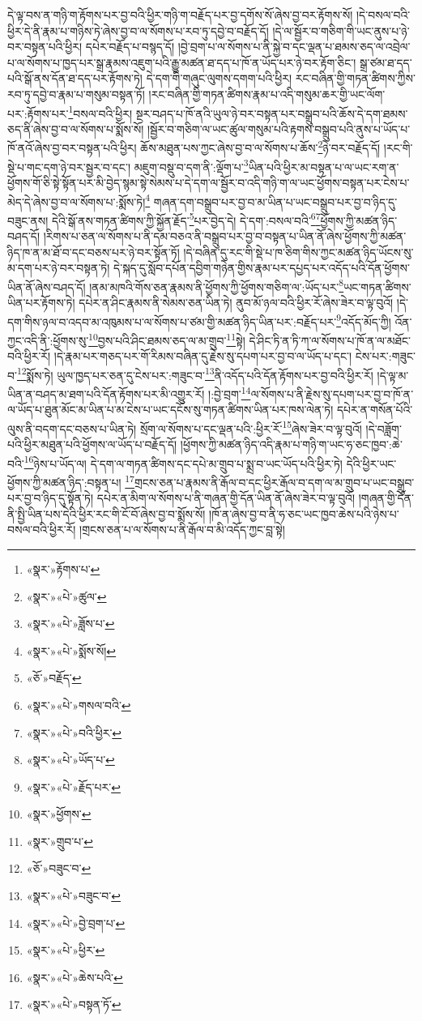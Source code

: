 དེ་ལྟ་བས་ན་གཉི་ག་རྟོགས་པར་བྱ་བའི་ཕྱིར་གཉི་ག་བརྗོད་པར་བྱ་དགོས་སོ་ཞེས་བྱ་བར་རྟོགས་སོ། །དེ་བསལ་བའི་ཕྱིར་དེ་ནི་རྣམ་པ་གཉིས་ཏེ་ཞེས་བྱ་བ་ལ་སོགས་པ་རབ་ཏུ་དབྱེ་བ་བརྗོད་དོ། །དེ་ལ་སྦྱོར་བ་གཅིག་གི་ཡང་ནུས་པ་ཉེ་བར་བསྟན་པའི་ཕྱིར། དཔེར་བརྗོད་པ་བསྙད་དོ། །བྱེ་བྲག་པ་ལ་སོགས་པ་ནི་སྐྱེ་བ་དང་ལྡན་པ་ཐམས་ཅད་ལ་འབྲེལ་པ་ལ་སོགས་པ་ཁྱད་པར་སྒྲ་རྣམས་འཇུག་པའི་རྒྱུ་མཚན་ཐ་དད་པ་ཁོ་ན་ཡོད་པར་ཉེ་བར་རྟོག་ཅིང་། སྒྲ་ཙམ་ཐ་དད་པའི་སྒོ་ནས་དོན་ཐ་དད་པར་རྟོགས་ཏེ། དེ་དག་གི་གཞུང་ལུགས་དགག་པའི་ཕྱིར། རང་བཞིན་གྱི་གཏན་ཚིགས་ཀྱིས་རབ་ཏུ་དབྱེ་བ་རྣམ་པ་གསུམ་བསྟན་ཏོ། །རང་བཞིན་གྱི་གཏན་ཚིགས་རྣམ་པ་འདི་གསུམ་ཆར་གྱི་ཡང་ལོག་པར་:རྟོགས་པར་\footnote{«སྣར་»རྟོགས་པ་}བསལ་བའི་ཕྱིར། སྔར་བཤད་པ་ཁོ་ནའི་ཡུལ་ཉེ་བར་བསྟན་པར་བསྒྲུབ་པའི་ཆོས་དེ་དག་ཐམས་ཅད་ནི་ཞེས་བྱ་བ་ལ་སོགས་པ་སྨོས་སོ། །སྦྱོར་བ་གཅིག་ལ་ཡང་ཚུལ་གསུམ་པའི་རྟགས་བསྒྲུབ་པའི་ནུས་པ་ཡོད་པ་ཁོ་ནའོ་ཞེས་བྱ་བར་བསྟན་པའི་ཕྱིར། ཆོས་མཐུན་པས་ཀྱང་ཞེས་བྱ་བ་ལ་སོགས་པ་ཆོས་\footnote{«སྣར་»«པེ་»ཚུལ་}ཉེ་བར་བརྗོད་དོ། །རང་གི་སྡེ་པ་གང་དག་ཉེ་བར་སྦྱར་བ་དང་། མཇུག་བསྡུ་བ་དག་ནི་:ལྡོག་པ་\footnote{«སྣར་»«པེ་»ཟློས་པ་}ཡིན་པའི་ཕྱིར་མ་བསྟན་པ་ལ་ཡང་རག་ན་ཕྱོགས་གོ་ཅི་སྟེ་སྟོན་པར་མི་བྱེད་སྙམ་སྟེ་སེམས་པ་དེ་དག་ལ་སྦྱོར་བ་འདི་གཉི་ག་ལ་ཡང་ཕྱོགས་བསྟན་པར་ངེས་པ་མེད་དེ་ཞེས་བྱ་བ་ལ་སོགས་པ་:སྨོས་ཏེ།\footnote{«སྣར་»«པེ་»སྨོས་སོ།} གཞན་དག་བསྒྲུབ་པར་བྱ་བ་མ་ཡིན་པ་ཡང་བསྒྲུབ་པར་བྱ་བ་ཉིད་དུ་བཟུང་ནས། དེའི་སྒོ་ནས་གཏན་ཚིགས་ཀྱི་སྐྱོན་རྗོད་\footnote{«ཅོ་»བརྗོད་}པར་བྱེད་དེ། དེ་དག་:བསལ་བའི་\footnote{«སྣར་»«པེ་»གསལ་བའི་}\footnote{«སྣར་»«པེ་»བའི་ཕྱིར་}ཕྱོགས་ཀྱི་མཚན་ཉིད་བཤད་དོ། །རིགས་པ་ཅན་ལ་སོགས་པ་ནི་དམ་བཅའ་ནི་བསྒྲུབ་པར་བྱ་བ་བསྟན་པ་ཡིན་ནོ་ཞེས་ཕྱོགས་ཀྱི་མཚན་ཉིད་ཁ་ན་མ་ཐོ་བ་དང་བཅས་པར་ཉེ་བར་སྟོན་ཏོ། །དེ་བཞིན་དུ་རང་གི་སྡེ་པ་ཁ་ཅིག་གིས་ཀྱང་མཚན་ཉིད་ཡོངས་སུ་མ་དག་པར་ཉེ་བར་བསྟན་ཏེ། དེ་སྐད་དུ་སློབ་དཔོན་དབྱིག་གཉེན་གྱིས་རྣམ་པར་དཔྱད་པར་འདོད་པའི་དོན་ཕྱོགས་ཡིན་ནོ་ཞེས་བཤད་དོ། །ནམ་མཁའི་གོས་ཅན་རྣམས་ནི་ཕྱོགས་ཀྱི་ཕྱོགས་གཅིག་ལ་:ཡོད་པར་\footnote{«སྣར་»«པེ་»ཡོད་པ་}ཡང་གཏན་ཚིགས་ཡིན་པར་རྟོགས་ཏེ། དཔེར་ན་ཤིང་རྣམས་ནི་སེམས་ཅན་ཡིན་ཏེ། ནུབ་མོ་ཉལ་བའི་ཕྱིར་རོ་ཞེས་ཟེར་བ་ལྟ་བུའོ། །དེ་དག་གིས་ཉལ་བ་འདབ་མ་འཁུམས་པ་ལ་སོགས་པ་ཙམ་གྱི་མཚན་ཉིད་ཡིན་པར་:བརྗོད་པར་\footnote{«སྣར་»«པེ་»རྗོད་པར་}འདོད་མོད་ཀྱི། འོན་ཀྱང་འདི་ནི་:ཕྱོགས་སུ་\footnote{«སྣར་»ཕྱོགས་}བྱས་པའི་ཤིང་ཐམས་ཅད་ལ་མ་གྲུབ་\footnote{«སྣར་»གྲུབ་པ་}སྟེ། དེ་ཤིང་ཏི་ན་ཏི་ཀ་ལ་སོགས་པ་ཁོ་ན་ལ་མཐོང་བའི་ཕྱིར་རོ། །དེ་རྣམ་པར་གཅད་པར་གོ་རིམས་བཞིན་དུ་རྗེས་སུ་དཔག་པར་བྱ་བ་ལ་ཡོད་པ་དང་། ངེས་པར་:གཟུང་བ་\footnote{«ཅོ་»བཟུང་བ་}སྨོས་ཏེ། ཡུལ་ཁྱད་པར་ཅན་དུ་ངེས་པར་:གཟུང་བ་\footnote{«སྣར་»«པེ་»བཟུང་བ་}ནི་འདོད་པའི་དོན་རྟོགས་པར་བྱ་བའི་ཕྱིར་རོ། །དེ་ལྟ་མ་ཡིན་ན་བཤད་མ་ཐག་པའི་དོན་རྟོགས་པར་མི་འགྱུར་རོ། །:བྱེ་བྲག་\footnote{«སྣར་»«པེ་»བྱེ་བྲག་པ་}ལ་སོགས་པ་ནི་རྗེས་སུ་དཔག་པར་བྱ་བ་ཁོ་ན་ལ་ཡོད་པ་ཐུན་མོང་མ་ཡིན་པ་མ་ངེས་པ་ཡང་དངོས་སུ་གཏན་ཚིགས་ཡིན་པར་ཁས་ལེན་ཏེ། དཔེར་ན་གསོན་པོའི་ལུས་ནི་བདག་དང་བཅས་པ་ཡིན་ཏེ། སྲོག་ལ་སོགས་པ་དང་ལྡན་པའི་:ཕྱིར་རོ་\footnote{«སྣར་»«པེ་»ཕྱིར་}ཞེས་ཟེར་བ་ལྟ་བུའོ། །དེ་བཟློག་པའི་ཕྱིར་མཐུན་པའི་ཕྱོགས་ལ་ཡོད་པ་བརྗོད་དོ། །ཕྱོགས་ཀྱི་མཚན་ཉིད་འདི་རྣམ་པ་གཉི་ག་ཡང་ཧ་ཅང་ཁྱབ་:ཆེ་བའི་\footnote{«སྣར་»«པེ་»ཆེས་པའི་}ཉེས་པ་ཡོད་ལ། དེ་དག་ལ་གཏན་ཚིགས་དང་དཔེ་མ་གྲུབ་པ་སྨྲ་བ་ཡང་ཡོད་པའི་ཕྱིར་ཏེ། དེའི་ཕྱིར་ཡང་ཕྱོགས་ཀྱི་མཚན་ཉིད་:བསྟན་པ། \footnote{«སྣར་»«པེ་»བསྟན་ཏོ་}གྲངས་ཅན་པ་རྣམས་ནི་རྒོལ་བ་དང་ཕྱིར་རྒོལ་བ་དག་ལ་མ་གྲུབ་པ་ཡང་བསྒྲུབ་པར་བྱ་བ་ཉིད་དུ་སྟོན་ཏེ། དཔེར་ན་མིག་ལ་སོགས་པ་ནི་གཞན་གྱི་དོན་ཡིན་ནོ་ཞེས་ཟེར་བ་ལྟ་བུའོ། །གཞན་གྱི་དོན་ནི་སྤྱི་ཡིན་པས་དེའི་ཕྱིར་རང་གི་ངོ་བོ་ཞེས་བྱ་བ་སྨོས་སོ། །ཁོ་ན་ཞེས་བྱ་བ་ནི་ཧ་ཅང་ཡང་ཁྱབ་ཆེས་པའི་ཉེས་པ་བསལ་བའི་ཕྱིར་རོ། །གྲངས་ཅན་པ་ལ་སོགས་པ་ནི་རྒོལ་བ་མི་འདོད་ཀྱང་བླ་སྟེ། 